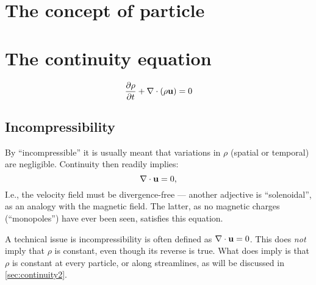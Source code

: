\section{The concept of particle}

\section{The continuity equation}
\label{sec:continuity}

\begin{equation}
  \label{eq:continuity}
  \frac{\partial \rho }{\partial t} +  \nabla \cdot (\rho \mathbf{u} ) = 0 
\end{equation}

\subsection{Incompressibility}

By ``incompressible'' it is usually meant that variations in $\rho$
(spatial or temporal) are negligible. Continuity then readily implies:
\[
\nabla \cdot  \mathbf{u}  = 0 ,
\]
I.e., the velocity field must be divergence-free --- another adjective
is ``solenoidal'', as an analogy with the magnetic field. The latter,
as no magnetic charges (``monopoles'') have ever been seen, satisfies
this equation.

A technical issue is incompressibility is often defined as $\nabla
\cdot \mathbf{u} = 0 $. This does \emph{not} imply that $\rho$ is constant,
even though its reverse is true. What does imply is that $\rho$ is
constant at every particle, or along streamlines, as will be discussed
in \ref{sec:continuity2}.
